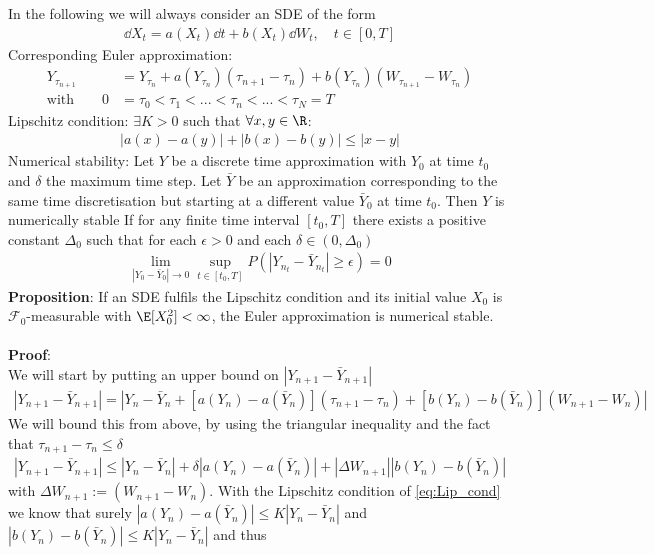 In the following we will always consider an SDE of the form
\begin{align}
\dd X_t = a(X_t)\dd t + b(X_t) \dd W_t, \quad t\in[0,T]
\end{align}
Corresponding Euler approximation:
\begin{align}
Y_{\tau_{n+1}}&= Y_{\tau_{n}}+a(Y_{\tau_{n}})(\tau_{n+1}-\tau_{n})+b(Y_{\tau_{n}})(W_{\tau_{n+1}}-W_{\tau_{n}})\\
\text{with}\qquad0 &= \tau_{0}<\tau_{1}<...<\tau_{n}<...<\tau_{N} = T
\end{align}
Lipschitz condition: $\exists K>0$ such that $\forall x,y \in \R$: 
\begin{align}
|a(x)-a(y)|+|b(x)-b(y)|\leq |x-y|\label{eq:Lip_cond}
\end{align}
Numerical stability: Let $Y$ be a discrete time approximation with $Y_0$ at time $t_0$ and $\delta$ the maximum time step. Let $\bar{Y}$ be an approximation corresponding to the same time discretisation but starting at a different value $\bar{Y}_0$ at time $t_0$. Then $Y$ is numerically stable If for any finite  time interval $[t_0,T]$ there exists a positive constant $\Delta_0$ such that for each $\epsilon>0$ and each $\delta \in (0,\Delta_0)$
\begin{align}
\lim_{|Y_0-\bar{Y}_0|\rightarrow 0}\sup_{t\in[t_0,T]} P\left(|Y_{n_t}-\bar{Y}_{n_t}|\geq \epsilon\right) =0
\end{align}
\textbf{Proposition}: If an SDE fulfils the Lipschitz condition and its initial value $X_0$ is $\mathscr{F}_0$-measurable with $\E[X_0^2]<\infty$, the Euler approximation is numerical stable.\\ \\
\textbf{Proof}:\\
We will start by putting an upper bound on $\left|Y_{n+1}-\bar{Y}_{n+1}\right|$
\begin{align}
\left|Y_{n+1}-\bar{Y}_{n+1}\right| = \left|Y_n-\bar{Y}_{n}+[a(Y_n)-a(\bar{Y}_n)](\tau_{n+1}-\tau_n) +[b(Y_n)-b(\bar{Y}_n)](W_{n+1}-W_n)\right|
\end{align}
We will bound this from above, by using the triangular inequality and the fact that $\tau_{n+1}-\tau_n\leq \delta$
\begin{align}
\left|Y_{n+1}-\bar{Y}_{n+1}\right| \leq  \left|Y_n-\bar{Y}_{n}\right|+\delta\left|a(Y_n)-a(\bar{Y}_n)\right| +\left|\Delta W_{n+1}\right|\left|b(Y_n)-b(\bar{Y}_n)\right|
\end{align}
with $\Delta W_{n+1}:=(W_{n+1}-W_n)$. With the Lipschitz condition of \cref{eq:Lip_cond} we know that surely \mbox{$\left|a(Y_n)-a(\bar{Y}_n)\right|\leq K \left|Y_n-\bar{Y}_{n}\right|$} and \mbox{$\left|b(Y_n)-b(\bar{Y}_n)\right|\leq K \left|Y_n-\bar{Y}_{n}\right|$} and thus
